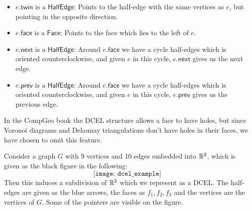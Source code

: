 \begin{defn}[DCEL]
\begin{description}
\begin{itemize}
    \item $e.\textsf{twin} \text{ is a } \textsf{HalfEdge}$: Points to the half-edge with the same vertices as $e$, but pointing in the opposite direction.
    \item $e.\textsf{face} \text{ is a } \textsf{Face}$: Points to the face which lies to the left of $e$.
    \item $e.\textsf{next} \text{ is a } \textsf{HalfEdge}$: Around $e.\textsf{face}$ we have a cycle half-edges which is oriented counterclockwise, and given $e$ in this cycle, $e.\textsf{next}$ gives us the next edge.
    \item $e.\textsf{prev} \text{ is a } \textsf{HalfEdge}$: Around $e.\textsf{face}$ we have a cycle half-edges which is oriented counterclockwise, and given $e$ in this cycle, $e.\textsf{prev}$ gives us the previous edge.
  \end{itemize}
\end{description}
\end{defn}

\begin{rmk}
In the CompGeo book the DCEL structure allows a face to have holes, but since Voronoi diagrams and Delaunay triangulations don't have holes in their faces, we have chosen to omit this feature.
\end{rmk}

\begin{ex}
Consider a graph $G$ with 9 vertices and 10 edges embedded into $\mathbb{R}^2$, which is given as the black figure in the following:
\[
    \texttt{[image: dcel\_example]} %
\]
Then this induces a subdivision of $\mathbb{R}^2$ which we represent as a DCEL. The half-edges are given as the blue arrows, the faces as $f_1, f_2, f_3$ and the vertices are the vertices of $G$. Some of the pointers are visible on the figure.
\end{ex}

